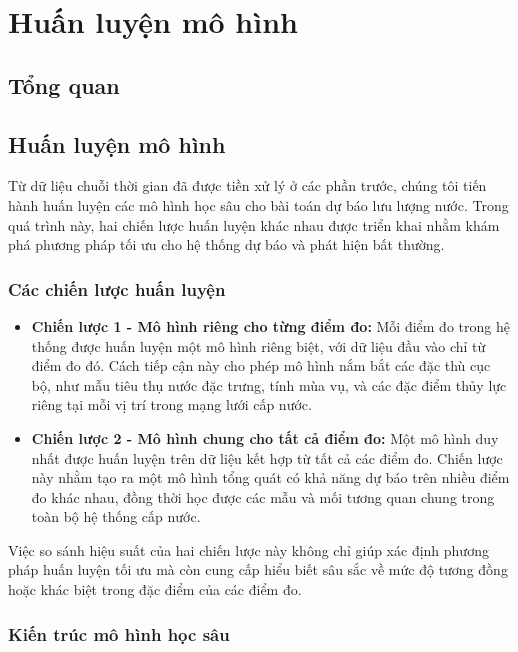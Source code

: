 \section{Huấn luyện mô hình}
\subsection{Tổng quan}
\subsection{Huấn luyện mô hình}

Từ dữ liệu chuỗi thời gian đã được tiền xử lý ở các phần trước, chúng tôi tiến hành huấn luyện các mô hình học sâu cho bài toán dự báo lưu lượng nước. Trong quá trình này, hai chiến lược huấn luyện khác nhau được triển khai nhằm khám phá phương pháp tối ưu cho hệ thống dự báo và phát hiện bất thường.

\subsubsection{Các chiến lược huấn luyện}

\begin{itemize}
    \item \textbf{Chiến lược 1 - Mô hình riêng cho từng điểm đo:} Mỗi điểm đo trong hệ thống được huấn luyện một mô hình riêng biệt, với dữ liệu đầu vào chỉ từ điểm đo đó. Cách tiếp cận này cho phép mô hình nắm bắt các đặc thù cục bộ, như mẫu tiêu thụ nước đặc trưng, tính mùa vụ, và các đặc điểm thủy lực riêng tại mỗi vị trí trong mạng lưới cấp nước.
    
    \item \textbf{Chiến lược 2 - Mô hình chung cho tất cả điểm đo:} Một mô hình duy nhất được huấn luyện trên dữ liệu kết hợp từ tất cả các điểm đo. Chiến lược này nhằm tạo ra một mô hình tổng quát có khả năng dự báo trên nhiều điểm đo khác nhau, đồng thời học được các mẫu và mối tương quan chung trong toàn bộ hệ thống cấp nước.
\end{itemize}

Việc so sánh hiệu suất của hai chiến lược này không chỉ giúp xác định phương pháp huấn luyện tối ưu mà còn cung cấp hiểu biết sâu sắc về mức độ tương đồng hoặc khác biệt trong đặc điểm của các điểm đo.

\subsubsection{Kiến trúc mô hình học sâu}

